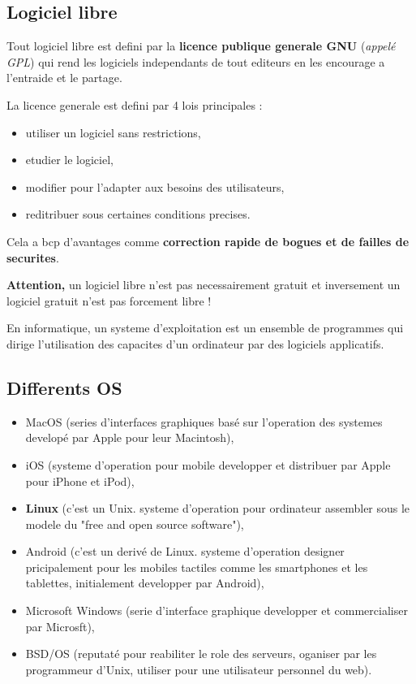 \subsection{Logiciel libre}

Tout logiciel libre est defini par la \textbf{licence publique generale GNU} (\textit{appelé GPL}) qui rend les logiciels independants de tout editeurs en les encourage a l'entraide et le partage.

La licence generale est defini par 4 lois principales :
\begin{itemize}
	\item utiliser un logiciel sans restrictions,
	\item etudier le logiciel,
	\item modifier pour l'adapter aux besoins des utilisateurs,
	\item reditribuer sous certaines conditions precises.
\end{itemize}
Cela a bcp d'avantages comme \textbf{correction rapide de bogues et de failles de securites}.

\textbf{Attention,} un logiciel libre n'est pas necessairement gratuit et inversement un logiciel gratuit n'est pas forcement libre ! \newpage


 

 
En informatique, un systeme d'exploitation est un ensemble de programmes qui dirige l'utilisation des capacites d'un ordinateur par des logiciels applicatifs.\newline


\subsection{Differents OS}
\begin{itemize}
\item MacOS (series d'interfaces graphiques basé sur l'operation des systemes developé par Apple pour leur Macintosh),
\item iOS (systeme d'operation pour mobile developper et distribuer par Apple pour iPhone et iPod),
\item \textbf{Linux} (c'est un Unix. systeme d'operation pour ordinateur assembler sous le modele du "free and open source software"),
\item Android (c'est un derivé de Linux. systeme d'operation designer pricipalement pour les mobiles tactiles comme les smartphones et les tablettes, initialement developper par Android),
\item Microsoft Windows (serie d'interface graphique developper et commercialiser par Microsft),
\item BSD/OS (reputaté pour reabiliter le role des serveurs, oganiser par les programmeur d'Unix, utiliser pour une utilisateur personnel du web).\newline
\end{itemize}



